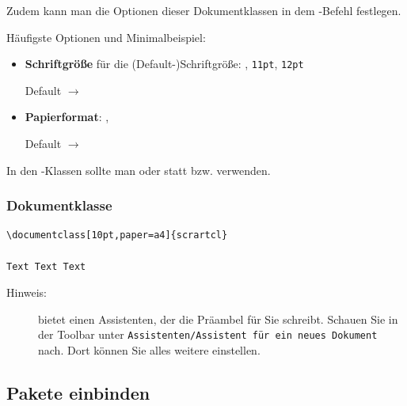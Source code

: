 \begin{frame}[fragile]

Zudem kann man die Optionen dieser Dokumentklassen in dem -Befehl festlegen.

Häufigste Optionen und Minimalbeispiel:

\begin{itemize}
	\item \textbf{Schriftgröße} für die (Default-)Schriftgröße: \ltxterm{10pt}, \texttt{11pt}, \texttt{12pt} \par
	Default $\rightarrow$ \ltxterm{10pt} 
	
	\item \textbf{Papierformat}: ,  \par
	Default $\rightarrow$  \par
\end{itemize}


In den -Klassen sollte man 
oder  statt  bzw.  verwenden.

\end{frame}


\begin{frame}[fragile]
\frametitle{Dokumentklasse}

\begin{lstlisting}
\documentclass[10pt,paper=a4]{scrartcl}

Text Text Text

\end{lstlisting}

\begin{description}
\item[Hinweis:]  bietet einen Assistenten, der die Präambel für Sie schreibt. Schauen Sie in der Toolbar unter \texttt{Assistenten/Assistent für ein neues Dokument} nach. Dort können Sie alles weitere einstellen.
\end{description}

\end{frame}


\subsection{Pakete einbinden}

